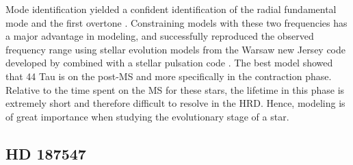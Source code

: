 %
%
%
%
%



Mode identification yielded a confident identification of the radial fundamental mode and the first overtone \citep{lenz2008asteroseismic}. Constraining models with these two frequencies has a major advantage in modeling, and \citet{lenz2010delta} successfully reproduced the observed frequency range using stellar evolution models from the Warsaw new Jersey code developed by combined with a stellar pulsation code \citep{paczynski1969envelopes}. The best model showed that 44 Tau is on the post-MS and more specifically in the contraction phase. Relative to the time spent on the MS for these stars, the lifetime in this phase is extremely short and therefore difficult to resolve in the HRD. Hence, modeling is of great importance when studying the evolutionary stage of a star. 
\\


\subsection{HD 187547}


